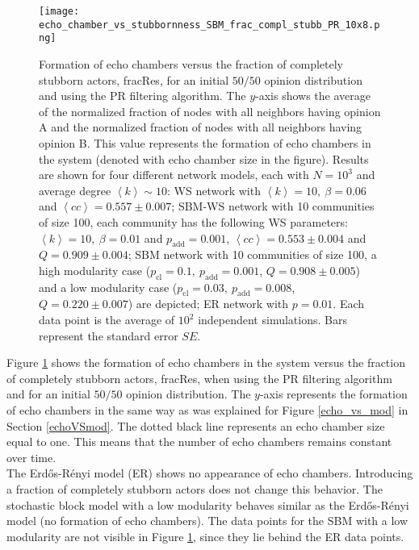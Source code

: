 \documentclass[11 pt , letterpaper , twoside , openright]{book}
\begin{document}
\begin{figure}[H]
	\texttt{[image: echo\_chamber\_vs\_stubbornness\_SBM\_frac\_compl\_stubb\_PR\_10x8.png]}
	\captionsetup{format=plain}
	\caption[Formation of echo chambers versus fraction of completely stubborn actors for the PR filtering algorithm and an initial $50/50$ opinion distribution.]{Formation of echo chambers versus the fraction of completely stubborn actors, fracRes, for an initial $50/50$ opinion distribution and using the PR filtering algorithm. The $y$-axis shows the average of the normalized fraction of nodes with all neighbors having opinion A and the normalized fraction of nodes with all neighbors having opinion B. This value represents the formation of echo chambers in the system (denoted with echo chamber size in the figure). Results are shown for four different network models, each with $N=10^3$ and average degree $\left<k\right> \sim 10$: WS network with $\left<k\right> =10,\ \beta = 0.06$ and $\left<cc\right> = 0.557 \pm 0.007$; SBM-WS network with 10 communities of size 100, each community has the following WS parameters: $\left<k\right> = 10,\ \beta = 0.01$ and $p_{\text{add}} = 0.001$, $\left<cc\right> = 0.553 \pm 0.004$ and $Q = 0.909 \pm 0.004$; SBM network with 10 communities of size 100, a high modularity case ($p_{\text{cl}} = 0.1,\ p_{\text{add}} = 0.001$, $Q = 0.908 \pm 0.005$) and a low modularity case ($p_{\text{cl}} = 0.03,\ p_{\text{add}} = 0.008$, $Q = 0.220 \pm 0.007$) are depicted; ER network with $p= 0.01$. Each data point is the average of $10^2$ independent simulations. Bars represent the standard error $SE$.}
\label{echo_vs_frac_complStubb}
\end{figure}
\noindent
Figure \ref{echo_vs_frac_complStubb} shows the formation of echo chambers in the system versus the fraction of completely stubborn actors, fracRes, when using the PR filtering algorithm and for an initial $50/50$ opinion distribution. The $y$-axis represents the formation of echo chambers in the same way as was explained for Figure \ref{echo_vs_mod} in Section \ref{echoVSmod}. The dotted black line represents an echo chamber size equal to one. This means that the number of echo chambers remains constant over time.\\
\newline
The Erd\H{o}s-R\'{e}nyi model (ER) shows no appearance of echo chambers. Introducing a fraction of completely stubborn actors does not change this behavior. The stochastic block model with a low modularity behaves similar as the Erd\H{o}s-R\'{e}nyi model (no formation of echo chambers). The data points for the SBM with a low modularity are not visible in Figure \ref{echo_vs_frac_complStubb}, since they lie behind the ER data points.\\
\end{document}

